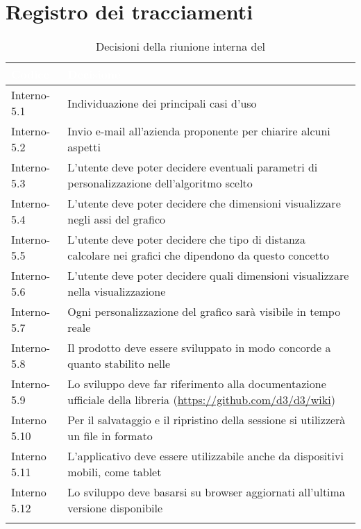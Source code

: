 \section{Registro dei tracciamenti}
{
\renewcommand{\arraystretch}{1.5}
\centering
\begin{longtable}{C{3cm} C{10cm}}
\textcolor{white}{\textbf{Codice}}&
\textcolor{white}{\textbf{Decisione}}\\	
\endhead
		
Interno-5.1 & Individuazione dei principali casi d'uso\\
Interno-5.2 & Invio e-mail all'azienda proponente per chiarire alcuni aspetti\\

Interno-5.3 & L'utente deve poter decidere eventuali parametri di personalizzazione dell'algoritmo scelto\\

Interno-5.4 & L'utente deve poter decidere che dimensioni visualizzare negli assi del grafico \\

Interno-5.5 & L'utente deve poter decidere che tipo di distanza calcolare nei grafici che dipendono da questo concetto\\

Interno-5.6 & L'utente deve poter decidere quali dimensioni visualizzare nella visualizzazione \\

Interno-5.7 & Ogni personalizzazione del grafico sarà visibile in tempo reale \\

Interno-5.8 & Il prodotto deve essere sviluppato in modo concorde a quanto stabilito nelle \NdPv{}\\

Interno-5.9 & Lo sviluppo deve far riferimento alla documentazione ufficiale della libreria  (\textcolor{blue}{\url{https://github.com/d3/d3/wiki}}) \\

Interno 5.10 & Per il salvataggio e il ripristino della sessione si utilizzerà un file in formato \\

Interno 5.11 & L'applicativo deve essere utilizzabile anche da dispositivi mobili, come tablet\\

Interno 5.12 & Lo sviluppo deve basarsi su browser aggiornati all'ultima versione disponibile\\

\caption{Decisioni della riunione interna del \Data{}}
		
\end{longtable}
}
